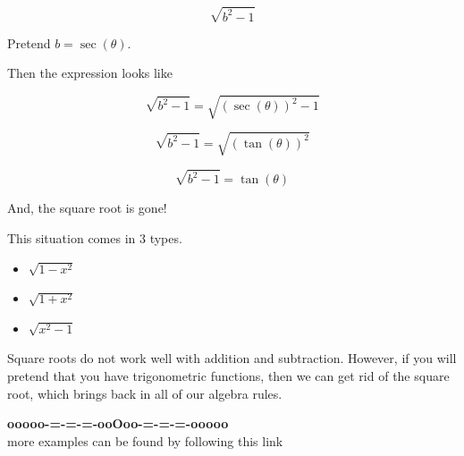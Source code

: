 \documentclass{ximera}
\begin{document}
\begin{example}


\[
\sqrt{b^2 - 1} 
\]


Pretend $b = \sec(\theta)$. 

Then the expression looks like

\[
\sqrt{b^2 - 1} = \sqrt{(\sec(\theta))^2 - 1}
\]


\[
\sqrt{b^2 - 1} = \sqrt{(\tan(\theta))^2}
\]


\[
\sqrt{b^2  - 1} = \tan(\theta)
\]



And, the square root is gone! 





\end{example}






This situation comes in 3 types.



\begin{itemize}
\item $\sqrt{1 - x^2}$
\item $\sqrt{1 + x^2}$
\item $\sqrt{x^2 - 1}$
\end{itemize}


Square roots do not work well with addition and subtraction.  However, if you will pretend that you have trigonometric functions, then we can get rid of the square root, which brings back in all of our algebra rules.


























\begin{onlineOnly}
\begin{center}
\textbf{\textcolor{green!50!black}{ooooo-=-=-=-ooOoo-=-=-=-ooooo}} \\

more examples can be found by following this link\\ 

\end{center}
\end{onlineOnly}
\end{document}
